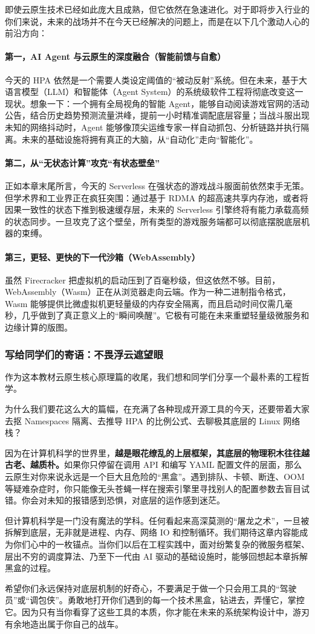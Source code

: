 即使云原生技术已经如此庞大且成熟，但它依然在急速进化。对于即将步入行业的你们来说，未来的战场并不在今天已经解决的问题上，而是在以下几个激动人心的前沿方向：

\paragraph{第一，AI Agent 与云原生的深度融合（智能前馈与自愈）}
今天的 HPA 依然是一个需要人类设定阈值的“被动反射”系统。但在未来，基于大语言模型（LLM）和智能体（Agent System）的系统级软件工程将彻底改变这一现状。想象一下：一个拥有全局视角的智能 Agent，能够自动阅读游戏官网的活动公告，结合历史趋势预测流量洪峰，提前一小时精准调配底层容量；当战斗服出现未知的网络抖动时，Agent 能够像顶尖运维专家一样自动抓包、分析链路并执行隔离。未来的基础设施将拥有真正的大脑，从“自动化”走向“智能化”。

\paragraph{第二，从“无状态计算”攻克“有状态壁垒”}
正如本章末尾所言，今天的 Serverless 在强状态的游戏战斗服面前依然束手无策。但学术界和工业界正在疯狂突围：通过基于 RDMA 的超高速共享内存池，或者将因果一致性的状态下推到极速缓存层，未来的 Serverless 引擎终将有能力承载高频的状态同步。一旦攻克了这个壁垒，所有类型的游戏服务端都可以彻底摆脱底层机器的束缚。

\paragraph{第三，更轻、更快的下一代沙箱（WebAssembly）}
虽然 Firecracker 把虚拟机的启动压到了百毫秒级，但这依然不够。目前，WebAssembly（Wasm）正在从浏览器走向云端。作为一种二进制指令格式，Wasm 能够提供比微虚拟机更轻量级的内存安全隔离，而且启动时间仅需几毫秒，几乎做到了真正意义上的“瞬间唤醒”。它极有可能在未来重塑轻量级微服务和边缘计算的版图。

\subsubsection{写给同学们的寄语：不畏浮云遮望眼}

作为这本教材云原生核心原理篇的收尾，我们想和同学们分享一个最朴素的工程哲学。

为什么我们要花这么大的篇幅，在充满了各种现成开源工具的今天，还要带着大家去抠 Namespaces 隔离、去推导 HPA 的比例公式、去聊极其底层的 Linux 网络栈？

因为在计算机科学的世界里，\textbf{越是眼花缭乱的上层框架，其底层的物理积木往往越古老、越质朴。}如果你只停留在调用 API 和编写 YAML 配置文件的层面，那么云原生对你来说永远是一个巨大且危险的“黑盒”。遇到排队、卡顿、断连、OOM 等疑难杂症时，你只能像无头苍蝇一样在搜索引擎里寻找别人的配置参数去盲目试错。你会对未知的报错感到恐惧，对底层的运作感到迷茫。

但计算机科学是一门没有魔法的学科。任何看起来高深莫测的“屠龙之术”，一旦被拆解到底层，无非就是进程、内存、网络 IO 和控制循环。我们期待这章内容能成为你们心中的一枚锚点。当你们以后在工程实践中，面对纷繁复杂的微服务框架、层出不穷的调度算法、乃至下一代由 AI 驱动的基础设施时，能够回想起本章拆解黑盒的过程。

希望你们永远保持对底层机制的好奇心，不要满足于做一个只会用工具的“驾驶员”或“调包侠”。勇敢地打开你们遇到的每一个技术黑盒，钻进去，弄懂它，掌控它。因为只有当你看穿了这些工具的本质，你才能在未来的系统架构设计中，游刃有余地造出属于你自己的战车。

\newpage